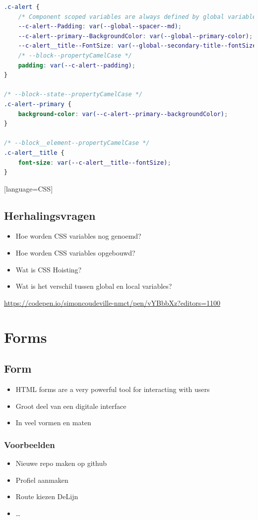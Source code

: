 \documentclass{article}
\begin{document}
\begin{lstlisting}[language=CSS]
.c-alert {
    /* Component scoped variables are always defined by global variables */
    --c-alert--Padding: var(--global--spacer--md);
    --c-alert--primary--BackgroundColor: var(--global--primary-color);
    --c-alert__title--FontSize: var(--global--secondary-title--fontSize);
    /* --block--propertyCamelCase */
    padding: var(--c-alert--padding);
}

/* --block--state--propertyCamelCase */
.c-alert--primary {
    background-color: var(--c-alert--primary--backgroundColor);
}

/* --block__element--propertyCamelCase */
.c-alert__title {
    font-size: var(--c-alert__title--fontSize);
}
\end{lstlisting}[language=CSS]

\subsection{Herhalingsvragen}

\begin{itemize}
    \item Hoe worden CSS variables nog genoemd?
    \item Hoe worden CSS variables opgebouwd?
    \item Wat is CSS Hoisting?
    \item Wat is het verschil tussen global en local variables?
\end{itemize}

\url{https://codepen.io/simoncoudeville-nmct/pen/vYBbbXz?editors=1100}

\section{Forms}

\subsection{Form}
\begin{itemize}
    \item HTML forms are a very powerful tool for interacting with users
    \item Groot deel van een digitale interface
    \item In veel vormen en maten
\end{itemize}

\subsubsection{Voorbeelden}
\begin{itemize}
    \item Nieuwe repo maken op github
    \item Profiel aanmaken
    \item Route kiezen DeLijn
    \item \dots
\end{itemize}
\end{document}
